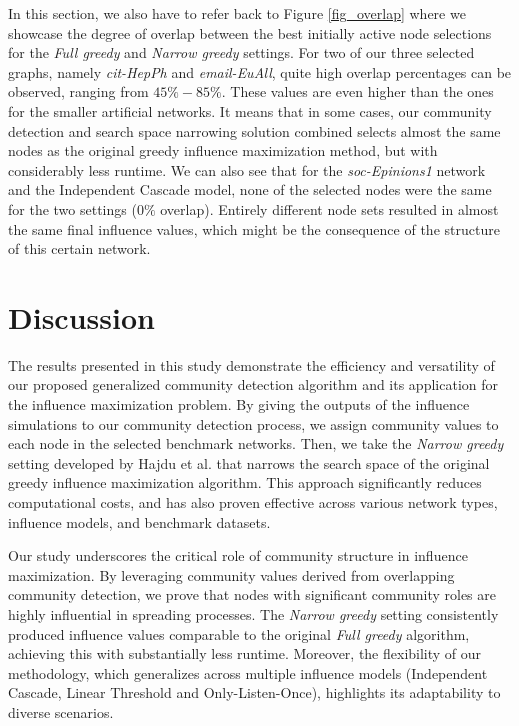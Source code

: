 \documentclass[pdflatex,sn-mathphys-ay]{sn-jnl}
\begin{document}
In this section, we also have to refer back to Figure \ref{fig_overlap} where we showcase the degree of overlap between the best initially active node selections for the \textit{Full greedy} and \textit{Narrow greedy} settings. For two of our three selected graphs, namely \textit{cit-HepPh} and \textit{email-EuAll}, quite high overlap percentages can be observed, ranging from $45\%-85\%$. These values are even higher than the ones for the smaller artificial networks. It means that in some cases, our community detection and search space narrowing solution combined selects almost the same nodes as the original greedy influence maximization method, but with considerably less runtime. We can also see that for the \textit{soc-Epinions1} network and the Independent Cascade model, none of the selected nodes were the same for the two settings ($0\%$ overlap). Entirely different node sets resulted in almost the same final influence values, which might be the consequence of the structure of this certain network.


\section{Discussion}\label{sec_discussion}

The results presented in this study demonstrate the efficiency and versatility of our proposed generalized community detection algorithm and its application for the influence maximization problem. By giving the outputs of the influence simulations to our community detection process, we assign community values to each node in the selected benchmark networks. Then, we take the \textit{Narrow greedy} setting developed by Hajdu et al. that narrows the search space of the original greedy influence maximization algorithm. This approach significantly reduces computational costs, and has also proven effective across various network types, influence models, and benchmark datasets.

Our study underscores the critical role of community structure in influence maximization. By leveraging community values derived from overlapping community detection, we prove that nodes with significant community roles are highly influential in spreading processes. The \textit{Narrow greedy} setting consistently produced influence values comparable to the original \textit{Full greedy} algorithm, achieving this with substantially less runtime. Moreover, the flexibility of our methodology, which generalizes across multiple influence models (Independent Cascade, Linear Threshold and Only-Listen-Once), highlights its adaptability to diverse scenarios.
\end{document}
